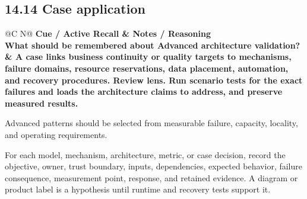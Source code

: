 \documentclass[11pt]{article}
\newcommand{\CornellHeader}{\rowcolor{Navy}\color{white}\bfseries Cue / Active Recall & \color{white}\bfseries Notes / Reasoning \\\endhead}
\newcommand{\CornellRow}[2]{\cellcolor{CueGray}\textbf{#1} & #2 \\\addlinespace[3pt]}
\begin{document}
\subsection{14.14 Case application}
\begin{longtable}{@{}C N@{}}
\CornellHeader
\CornellRow{What should be remembered about Advanced architecture validation?}{A case links business continuity or quality targets to mechanisms, failure domains, resource reservations, data placement, automation, and recovery procedures. \textbf{Review lens.} Run scenario tests for the exact failures and loads the architecture claims to address, and preserve measured results.}
\end{longtable}
\begin{sectionsummarybox}
Advanced patterns should be selected from measurable failure, capacity, locality, and operating requirements.
\end{sectionsummarybox}
\begin{practicebox}
For each model, mechanism, architecture, metric, or case decision, record the objective, owner, trust boundary, inputs, dependencies, expected behavior, failure consequence, measurement point, response, and retained evidence. A diagram or product label is a hypothesis until runtime and recovery tests support it.
\end{practicebox}
\end{document}

